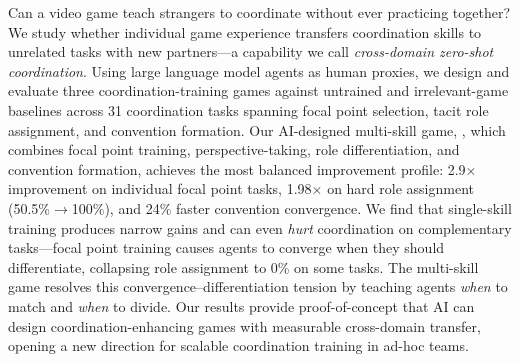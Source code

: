 Can a video game teach strangers to coordinate without ever practicing together?
We study whether individual game experience transfers coordination skills to unrelated tasks with new partners---a capability we call \emph{cross-domain zero-shot coordination}.
Using large language model agents as human proxies, we design and evaluate three coordination-training games against untrained and irrelevant-game baselines across 31 coordination tasks spanning focal point selection, tacit role assignment, and convention formation.
Our AI-designed multi-skill game, \syncminds, which combines focal point training, perspective-taking, role differentiation, and convention formation, achieves the most balanced improvement profile: 2.9$\times$ improvement on individual focal point tasks, 1.98$\times$ on hard role assignment (50.5\%$\to$100\%), and 24\% faster convention convergence.
We find that single-skill training produces narrow gains and can even \emph{hurt} coordination on complementary tasks---focal point training causes agents to converge when they should differentiate, collapsing role assignment to 0\% on some tasks.
The multi-skill game resolves this convergence--differentiation tension by teaching agents \emph{when} to match and \emph{when} to divide.
Our results provide proof-of-concept that AI can design coordination-enhancing games with measurable cross-domain transfer, opening a new direction for scalable coordination training in ad-hoc teams.
